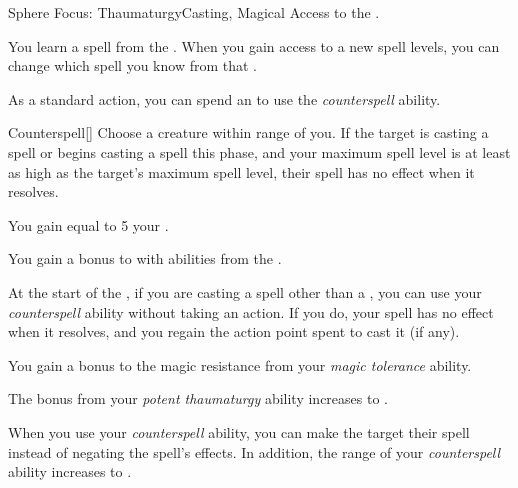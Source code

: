     \begin{feat}{Sphere Focus: Thaumaturgy}{Casting, Magical}
        \featpre Access to the  .

         You learn a spell from the  .
        When you gain access to a new spell levels, you can change which spell you know from that .

         As a standard action, you can spend an  to use the \textit{counterspell} ability.
        \begin{ability}{Counterspell}[]
            Choose a creature within \rngmed range of you.
            If the target is casting a spell or begins casting a spell this phase, and your maximum spell level is at least as high as the target's maximum spell level, their spell has no effect when it resolves.
        \end{ability}

         You gain  equal to 5 \add your .

         You gain a  bonus to  with abilities from the  . 

         At the start of the , if you are casting a spell other than a , you can use your \textit{counterspell} ability without taking an action.
        If you do, your spell has no effect when it resolves, and you regain the action point spent to cast it (if any).

         You gain a  bonus to the magic resistance from your \textit{magic tolerance} ability.

         The bonus from your \textit{potent thaumaturgy} ability increases to .

         When you use your \textit{counterspell} ability, you can make the target  their spell instead of negating the spell's effects.
        In addition, the range of your \textit{counterspell} ability increases to \rnglong.
    \end{feat}

